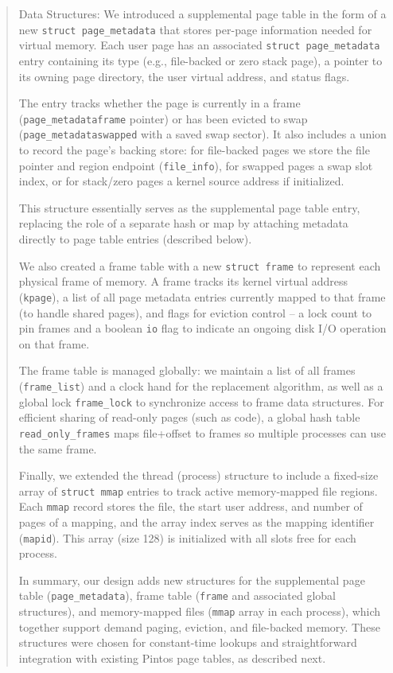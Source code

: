 \documentclass[a4paper,11pt]{paper}
\begin{document}
\begin{quote}
  Data Structures: We introduced a supplemental page table in the form of a new \texttt{struct page\_metadata} that stores per-page information needed for virtual memory. Each user page has an associated \texttt{struct page\_metadata} entry containing its type (e.g., file-backed or zero stack page), a pointer to its owning page directory, the user virtual address, and status flags. 

The entry tracks whether the page is currently in a frame (\texttt{page\_metadata{\textrightarrow}frame} pointer) or has been evicted to swap (\texttt{page\_metadata{\textrightarrow}swapped} with a saved swap sector). It also includes a union to record the page’s backing store: for file-backed pages we store the file pointer and region endpoint (\texttt{file\_info}), for swapped pages a swap slot index, or for stack/zero pages a kernel source address if initialized.

This structure essentially serves as the supplemental page table entry, replacing the role of a separate hash or map by attaching metadata directly to page table entries (described below).

We also created a frame table with a new \texttt{struct frame} to represent each physical frame of memory. A frame tracks its kernel virtual address (\texttt{kpage}), a list of all page metadata entries currently mapped to that frame (to handle shared pages), and flags for eviction control -- a lock count to pin frames and a boolean \texttt{io} flag to indicate an ongoing disk I/O operation on that frame.

The frame table is managed globally: we maintain a list of all frames (\texttt{frame\_list}) and a clock hand for the replacement algorithm, as well as a global lock \texttt{frame\_lock} to synchronize access to frame data structures. For efficient sharing of read-only pages (such as code), a global hash table \texttt{read\_only\_frames} maps file+offset to frames so multiple processes can use the same frame.

Finally, we extended the thread (process) structure to include a fixed-size array of \texttt{struct mmap} entries to track active memory-mapped file regions. Each \texttt{mmap} record stores the file, the start user address, and number of pages of a mapping, and the array index serves as the mapping identifier (\texttt{mapid}). This array (size 128) is initialized with all slots free for each process.

In summary, our design adds new structures for the supplemental page table (\texttt{page\_metadata}), frame table (\texttt{frame} and associated global structures), and memory-mapped files (\texttt{mmap} array in each process), which together support demand paging, eviction, and file-backed memory. These structures were chosen for constant-time lookups and straightforward integration with existing Pintos page tables, as described next.
\end{quote}
\end{document}
